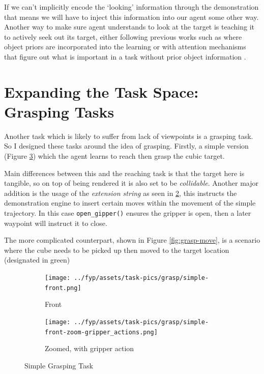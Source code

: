 If we can't implicitly encode the `looking' information through the demonstration that means we will have to inject this information into our agent some other way. Another way to make sure agent understands to look at the target is teaching it to actively seek out its target, either following previous works such as  where object priors are incorporated into the learning or with attention mechanisms that figure out what is important in a task without prior object information .  

\section{Expanding the Task Space: Grasping Tasks}
Another task which is likely to suffer from lack of viewpoints is a grasping task. So I designed these tasks around the idea of grasping. Firstly, a simple version (Figure \ref{fig:grasp-simple}) which the agent learns to reach then grasp the cubic target. 

Main differences between this and the reaching task is that the target here is tangible, so on top of being rendered it is also set to be \emph{collidable}. Another major addition is the usage of the \emph{extension string} as seen in \ref{subfig:simple-zoom-actions}, this instructs the demonstration engine to insert certain moves within the movement of the simple trajectory. In this case \verb|open_gipper()| ensures the gripper is open, then a later waypoint will instruct it to close.


The more complicated counterpart, shown in Figure \ref{fig:grasp-move}, is a scenario where the cube needs to be picked up then moved to the target location (designated in green)

\begin{figure}[htpb] %
  \centering
  \begin{subfigure}{0.3\linewidth}
    \centering
    \texttt{[image: ../fyp/assets/task-pics/grasp/simple-front.png]}
    \caption{Front}\label{subfig:simple-front}
  \end{subfigure}
  \hfill
  \begin{subfigure}{0.5\linewidth}
    \centering
    \texttt{[image: ../fyp/assets/task-pics/grasp/simple-front-zoom-gripper\_actions.png]}
    \caption{Zoomed, with gripper action}\label{subfig:simple-zoom-actions}
  \end{subfigure}
  \caption{Simple Grasping Task}\label{fig:grasp-simple}
\end{figure}

